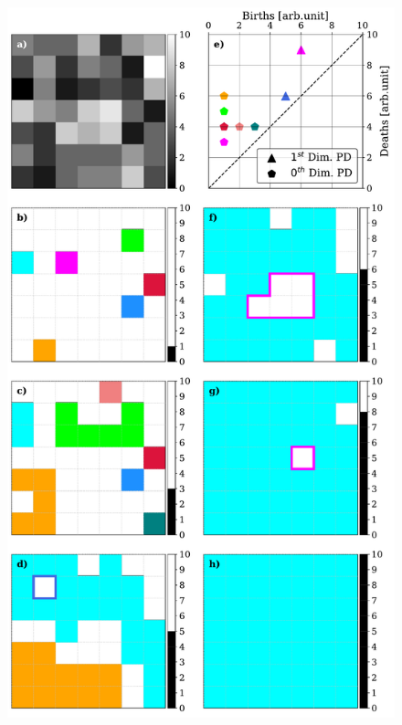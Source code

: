 \documentclass[12pt]{mythesis}
\begin{document}
\begin{figure}
    \begin{minipage}[c]{0.67\textwidth}
      \includegraphics[width=\textwidth]{figures/PersistentHomology/ImageFiltering_example_v.pdf}
    \end{minipage}\hfill
    \begin{minipage}[c]{0.3\textwidth}
      \caption{
}
\end{minipage}
\end{figure}
\end{document}
